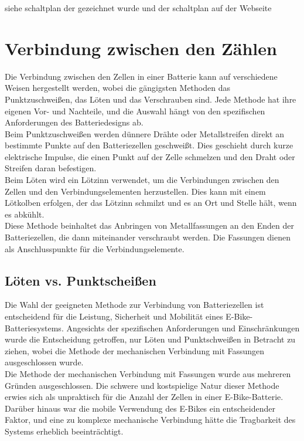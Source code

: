 siehe schaltplan der gezeichnet wurde
und der schaltplan auf der Webseite


\section{Verbindung zwischen den Zählen}
Die Verbindung zwischen den Zellen in einer Batterie kann auf verschiedene Weisen hergestellt werden, wobei die gängigsten Methoden das Punktzuschweißen, das Löten und das Verschrauben sind. Jede Methode hat ihre eigenen Vor- und Nachteile, und die Auswahl hängt von den spezifischen Anforderungen des Batteriedesigns ab.\\

Beim Punktzuschweißen werden dünnere Drähte oder Metallstreifen direkt an bestimmte Punkte auf den Batteriezellen geschweißt. Dies geschieht durch kurze elektrische Impulse, die einen Punkt auf der Zelle schmelzen und den Draht oder Streifen daran befestigen.\\

Beim Löten wird ein Lötzinn verwendet, um die Verbindungen zwischen den Zellen und den Verbindungselementen herzustellen. Dies kann mit einem Lötkolben erfolgen, der das Lötzinn schmilzt und es an Ort und Stelle hält, wenn es abkühlt.\\

Diese Methode beinhaltet das Anbringen von Metallfassungen an den Enden der Batteriezellen, die dann miteinander verschraubt werden. Die Fassungen dienen als Anschlusspunkte für die Verbindungselemente.\\

\subsection{Löten vs. Punktscheißen}
Die Wahl der geeigneten Methode zur Verbindung von Batteriezellen ist entscheidend für die Leistung, Sicherheit und Mobilität eines E-Bike-Batteriesystems. Angesichts der spezifischen Anforderungen und Einschränkungen wurde die Entscheidung getroffen, nur Löten und Punktschweißen in Betracht zu ziehen, wobei die Methode der mechanischen Verbindung mit Fassungen ausgeschlossen wurde.\\

Die Methode der mechanischen Verbindung mit Fassungen wurde aus mehreren Gründen ausgeschlossen. Die schwere und kostspielige Natur dieser Methode erwies sich als unpraktisch für die Anzahl der Zellen in einer E-Bike-Batterie. Darüber hinaus war die mobile Verwendung des E-Bikes ein entscheidender Faktor, und eine zu komplexe mechanische Verbindung hätte die Tragbarkeit des Systems erheblich beeinträchtigt.\\

